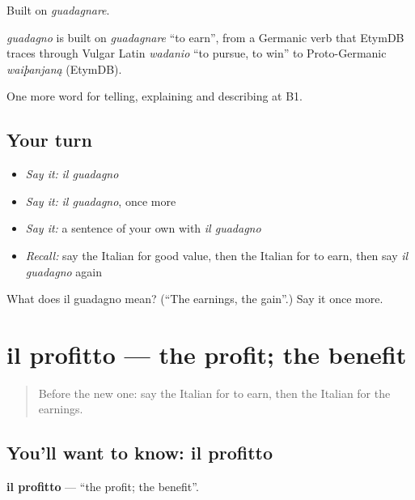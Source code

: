 Built on \emph{guadagnare}.

\begin{cousinweb}
\emph{guadagno} is built on \emph{guadagnare} \textquotedblleft{}to earn\textquotedblright{}, from a Germanic verb that EtymDB traces through Vulgar Latin \emph{wadanio} \textquotedblleft{}to pursue, to win\textquotedblright{} to Proto-Germanic \emph{waiþanjaną} (EtymDB).
\end{cousinweb}

\begin{grammarlens}[title={What you've built}]
One more word for telling, explaining and describing at B1.
\end{grammarlens}

\subsection*{Your turn}
\begin{itemize}
\raggedright
  \item \emph{Say it:} \emph{il guadagno}
  \item \emph{Say it:} \emph{il guadagno}, once more
  \item \emph{Say it:} a sentence of your own with \emph{il guadagno}
  \item \emph{Recall:} say the Italian for good value, then the Italian for to earn, then say \emph{il guadagno} again
\end{itemize}

\begin{tcolorbox}[breakable,colback=teal!4,colframe=teal!35!black,title={Before you move on}]
What does il guadagno mean? (\textquotedblleft{}The earnings, the gain\textquotedblright{}.) Say it once more.
\end{tcolorbox}
\section[il profitto]{il profitto — the profit; the benefit}

\label{lesson:IT-C398-profitto}



\begin{quote}
Before the new one: say the Italian for to earn, then the Italian for the earnings.
\end{quote}

\subsection*{You'll want to know: il profitto}
\textbf{il profitto} — \textquotedblleft{}the profit; the benefit\textquotedblright{}.

